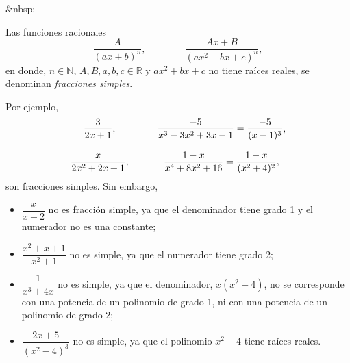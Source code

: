 \begin{rawhtml}
&nbsp;
\end{rawhtml}
\begin{definicion}
Las funciones racionales
\[ 
\frac{A}{(ax+b)^n} ,\qquad \qquad \frac{Ax+B}{(ax^2+bx+c)^n},
\]
en donde, $n\in\mathbb N$, $A,B,a,b,c\in\mathbb R$ y $ax^2+bx+c$ no tiene raíces reales, 
se denominan \emph{fracciones simples}.
\end{definicion}
%
Por ejemplo,
\[
\begin{array}{c@{\qquad\quad}c}
\dfrac{3}{2x+1}, & \dfrac{-5}{x^3-3x^2+3x-1}=\dfrac{-5}{(x-1)^3},\\
\\
\dfrac{x}{2x^2+2x+1}, & \dfrac{1-x}{x^4+8x^2+16}=\dfrac{1-x}{(x^2+4)^2},
\end{array}
\]
son fracciones simples. Sin embargo,
\begin{itemize}
\item
$\dfrac{x}{x-2}$ no es fracción simple, ya que el denominador tiene grado 1 y el numerador no es una constante;
\item
$\dfrac{x^2+x+1}{x^2+1}$ no es simple, ya que el numerador tiene grado 2;
\item
$\dfrac{1}{x^3+4x}$ no es simple, ya que el denominador, $x(x^2+4)$, no se corresponde con una potencia de un polinomio de grado 1, ni con una potencia de un polinomio de grado 2;
\item
$\dfrac{2x+5}{(x^2-4)^3}$ no es simple, ya que el polinomio $x^2-4$ tiene raíces reales.
\end{itemize}


